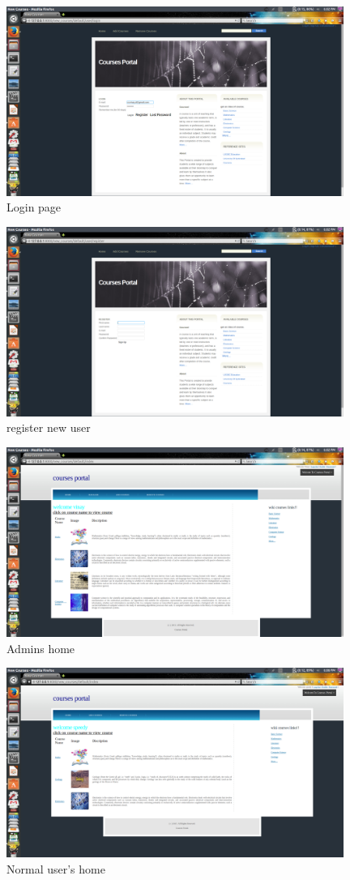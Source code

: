 \documentclass{article}
\begin{document}
\begin{figure}[ht!]
\centering
\includegraphics[width=110mm]{login.png}
\caption{Login page}
\end{figure}
\begin{figure}[ht!]
\centering
\includegraphics[width=110mm]{register.png}
\caption{register new user}
\end{figure}
\begin{figure}[ht!]
\centering
\includegraphics[width=110mm]{home.png}
\caption{Admins home}
\end{figure}
\begin{figure}[ht!]
\centering
\includegraphics[width=110mm]{User_home.png}
\caption{Normal user's home}
\end{figure}
\end{document}
